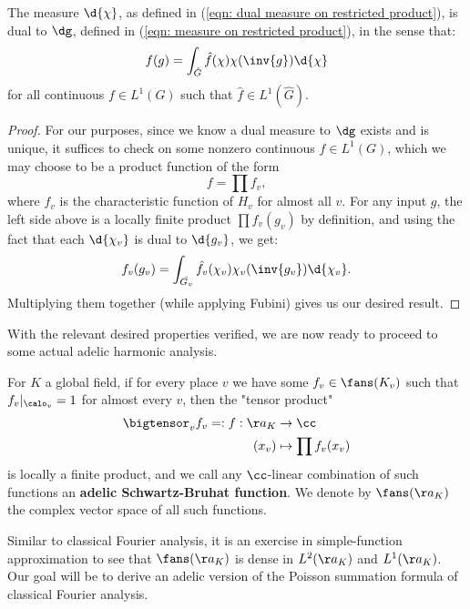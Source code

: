 \documentclass[11pt, x11names, openany]{book}
\begin{document}
\begin{prop}
\label{prop: duality of measure on restricted product}
The measure $\d{\chi}$, as defined in (\ref{eqn: dual measure on restricted product}), is dual to $\dg$, defined in (\ref{eqn: measure on restricted product}), in the sense that:
\begin{equation*}
    f(g) = \int_{\hat{G}} \hat{f}(\chi) \chi(\inv{g}) \d{\chi}
\end{equation*}
for all continuous $f \in L^1(G)$ such that $\hat{f} \in L^1(\hat{G})$.
\end{prop}
\begin{proof}
    For our purposes, since we know a dual measure to $\dg$ exists and is unique, it suffices to check on some nonzero continuous $f \in L^1(G)$, which we may choose to be a product function of the form
    \begin{equation*}
        f = \prod f_v,
    \end{equation*}
    where $f_v$ is the characteristic function of $H_v$ for almost all $v$. For any input $g$, the left side above is a locally finite product $\prod f_v(g_v)$ by definition, and using the fact that each $\d{\chi_v}$ is dual to $\d{g_v}$, we get:
    \begin{equation*}
        f_v(g_v) = \int_{\hat{G_v}} \hat{f_v}(\chi_v) \chi_v(\inv{g_v}) \d{\chi_v}.
    \end{equation*}
    Multiplying them together (while applying Fubini) gives us our desired result.
\end{proof}

With the relevant desired properties verified, we are now ready to proceed to some actual adelic harmonic analysis.

\begin{defn}
    \label{def: adelic SB func}
    For $K$ a global field, if for every place $v$ we have some $f_v \in \fans(K_v)$ such that $f_v \vert_{\calo_v} = 1$ for almost every $v$, then the "tensor product"
\begin{align*}
\bigtensor_v f_v =: f : \aa_K &\to \cc\\
(x_v) & \mapsto \prod f_v(x_v)
\end{align*}
is locally a finite product, and we call any $\cc$-linear combination of such functions an \textbf{adelic Schwartz-Bruhat function}. We denote by $\fans(\aa_K)$ the complex vector space of all such functions.
\end{defn}

Similar to classical Fourier analysis, it is an exercise in simple-function approximation to see that $\fans(\aa_K)$ is dense in $L^2(\aa_K)$ and $L^1(\aa_K)$. Our goal will be to derive an adelic version of the Poisson summation formula of classical Fourier analysis.\\
\end{document}
